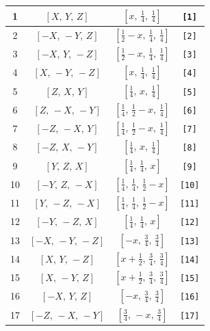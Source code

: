 \documentclass[fleqn,8pt]{jsarticle}
\begin{document}
\begin{longtable}{cccc}
1 & $\left[ X,\, Y,\, Z \right]$ & $\left[ x,\, \frac{1}{4},\, \frac{1}{4} \right]$ & {\tt [1]} \\ \hline
2 & $\left[ - X,\, - Y,\, Z \right]$ & $\left[ \frac{1}{2} - x,\, \frac{1}{4},\, \frac{1}{4} \right]$ & {\tt [2]} \\ \hline
3 & $\left[ - X,\, Y,\, - Z \right]$ & $\left[ \frac{1}{2} - x,\, \frac{1}{4},\, \frac{1}{4} \right]$ & {\tt [3]} \\ \hline
4 & $\left[ X,\, - Y,\, - Z \right]$ & $\left[ x,\, \frac{1}{4},\, \frac{1}{4} \right]$ & {\tt [4]} \\ \hline
5 & $\left[ Z,\, X,\, Y \right]$ & $\left[ \frac{1}{4},\, x,\, \frac{1}{4} \right]$ & {\tt [5]} \\ \hline
6 & $\left[ Z,\, - X,\, - Y \right]$ & $\left[ \frac{1}{4},\, \frac{1}{2} - x,\, \frac{1}{4} \right]$ & {\tt [6]} \\ \hline
7 & $\left[ - Z,\, - X,\, Y \right]$ & $\left[ \frac{1}{4},\, \frac{1}{2} - x,\, \frac{1}{4} \right]$ & {\tt [7]} \\ \hline
8 & $\left[ - Z,\, X,\, - Y \right]$ & $\left[ \frac{1}{4},\, x,\, \frac{1}{4} \right]$ & {\tt [8]} \\ \hline
9 & $\left[ Y,\, Z,\, X \right]$ & $\left[ \frac{1}{4},\, \frac{1}{4},\, x \right]$ & {\tt [9]} \\ \hline
10 & $\left[ - Y,\, Z,\, - X \right]$ & $\left[ \frac{1}{4},\, \frac{1}{4},\, \frac{1}{2} - x \right]$ & {\tt [10]} \\ \hline
11 & $\left[ Y,\, - Z,\, - X \right]$ & $\left[ \frac{1}{4},\, \frac{1}{4},\, \frac{1}{2} - x \right]$ & {\tt [11]} \\ \hline
12 & $\left[ - Y,\, - Z,\, X \right]$ & $\left[ \frac{1}{4},\, \frac{1}{4},\, x \right]$ & {\tt [12]} \\ \hline
13 & $\left[ - X,\, - Y,\, - Z \right]$ & $\left[ - x,\, \frac{3}{4},\, \frac{3}{4} \right]$ & {\tt [13]} \\ \hline
14 & $\left[ X,\, Y,\, - Z \right]$ & $\left[ x + \frac{1}{2},\, \frac{3}{4},\, \frac{3}{4} \right]$ & {\tt [14]} \\ \hline
15 & $\left[ X,\, - Y,\, Z \right]$ & $\left[ x + \frac{1}{2},\, \frac{3}{4},\, \frac{3}{4} \right]$ & {\tt [15]} \\ \hline
16 & $\left[ - X,\, Y,\, Z \right]$ & $\left[ - x,\, \frac{3}{4},\, \frac{3}{4} \right]$ & {\tt [16]} \\ \hline
17 & $\left[ - Z,\, - X,\, - Y \right]$ & $\left[ \frac{3}{4},\, - x,\, \frac{3}{4} \right]$ & {\tt [17]} \\ \hline

\end{longtable}
\end{document}
